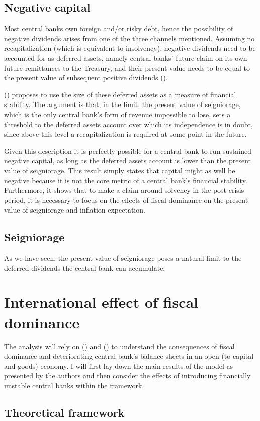 \documentclass[american]{scrartcl}
\newcommand{\citein}[1]{\citeauthor{#1} (\citeyear{#1})}
\begin{document}
\subsection{Negative capital}

Most central banks own foreign and/or risky debt, hence the possibility of negative dividends arises from one of the three channels mentioned. Assuming no recapitalization (which is equivalent to insolvency), negative dividends need to be accounted for as deferred assets, namely central banks' future claim on its own future remittances to the Treasury, and their present value needs to be equal to the present value of subsequent positive dividends (\cite{Archer2013}).

\citein{Reis2015} proposes to use the size of these deferred assets as a measure of financial stability. The argument is that, in the limit, the present value of seigniorage, which is the only central bank's form of revenue impossible to lose, sets a threshold to the deferred assets account over which its independence is in doubt, since above this level a recapitalization is required at some point in the future. %

Given this description it is perfectly possible for a central bank to run sustained negative capital, as long as the deferred assets account is lower than the present value of seigniorage. This result simply states that capital might as well be negative because it is not the core metric of a central bank's financial stability. Furthermore, it shows that to make a claim around solvency in the post-crisis period, it is necessary to focus on the effects of fiscal dominance on the present value of seigniorage and inflation expectation.

\subsection{Seigniorage}

As we have seen, the present value of seigniorage poses a natural limit to the deferred dividends the central bank can accumulate.

\section{International effect of fiscal dominance}

The analysis will rely on \citein{Caballero2016} and \citein{Cook2013} to understand the consequences of fiscal dominance and deteriorating central bank's balance sheets in an open (to capital and goods) economy. I will first lay down the main results of the model as presented by the authors and then consider the effects of introducing financially unstable central banks within the framework.

\subsection{Theoretical framework}



\newpage
\printbibliography
\end{document}
